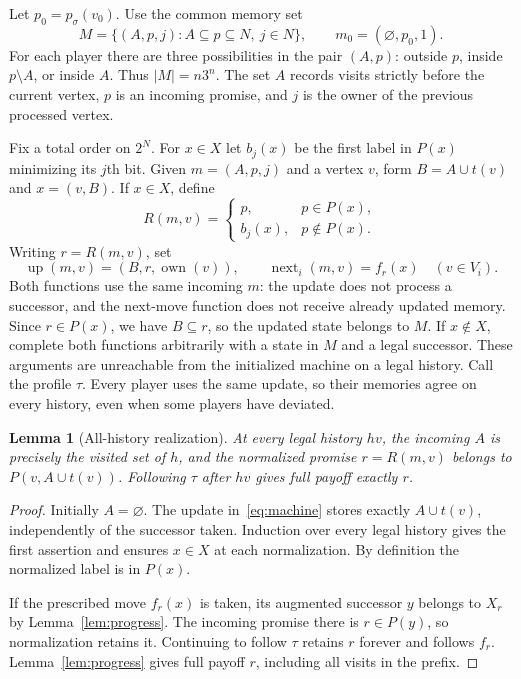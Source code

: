 \documentclass[acmlarge,11pt,screen,nonacm,natbib=false]{acmart}
\newcommand{\own}{\operatorname{own}}
\newcommand{\up}{\operatorname{up}}
\newcommand{\nxt}{\operatorname{next}}
\newtheorem{lemma}[theorem]{Lemma}
\theoremstyle{remark}
\begin{document}
Let $p_0=p_\sigma(v_0)$. Use the common memory set
\[
 M=\{(A,p,j): A\subseteq p\subseteq N,\ j\in N\},
 \qquad m_0=(\varnothing,p_0,1).
\]
For each player there are three possibilities in the pair $(A,p)$:
outside $p$, inside $p\setminus A$, or inside $A$. Thus $|M|=n3^n$.
The set $A$ records visits strictly before the current vertex, $p$ is an
incoming promise, and $j$ is the owner of the previous processed vertex.

Fix a total order on $2^N$. For $x\in X$ let $b_j(x)$ be the first label
in $P(x)$ minimizing its $j$th bit. Given $m=(A,p,j)$ and a vertex $v$,
form $B=A\cup t(v)$ and $x=(v,B)$. If $x\in X$, define
\[
 R(m,v)=\begin{cases}
 p,&p\in P(x),\\
 b_j(x),&p\notin P(x).
 \end{cases}
\]
Writing $r=R(m,v)$, set
\begin{equation}\label{eq:machine}
 \up(m,v)=(B,r,\own(v)),\qquad
 \nxt_i(m,v)=f_r(x)\quad(v\in V_i).
\end{equation}
Both functions use the same incoming $m$: the update does not process a
successor, and the next-move function does not receive already updated
memory. Since $r\in P(x)$, we have $B\subseteq r$, so the updated state
belongs to $M$. If $x\notin X$, complete both functions arbitrarily with
a state in $M$ and a legal successor. These arguments are unreachable from
the initialized machine on a legal history. Call the profile $\tau$.
Every player uses the same update, so their memories agree on
every history, even when some players have deviated.

\begin{lemma}[All-history realization]\label{lem:realization}
At every legal history $hv$, the incoming $A$ is precisely the visited set
of $h$, and the normalized promise $r=R(m,v)$ belongs to $P(v,A\cup t(v))$.
Following $\tau$ after $hv$ gives full payoff exactly $r$.
\end{lemma}
\begin{proof}
Initially $A=\varnothing$. The update in~\eqref{eq:machine} stores exactly
$A\cup t(v)$, independently of the successor taken. Induction over every
legal history gives the first assertion and ensures $x\in X$ at each
normalization. By definition the normalized label is in $P(x)$.

If the prescribed move $f_r(x)$ is taken, its augmented successor $y$
belongs to $X_r$ by Lemma~\ref{lem:progress}. The incoming promise there
is $r\in P(y)$, so normalization retains it. Continuing to follow $\tau$
retains $r$ forever and follows $f_r$. Lemma~\ref{lem:progress} gives full
payoff $r$, including all visits in the prefix.
\end{proof}
\end{document}
